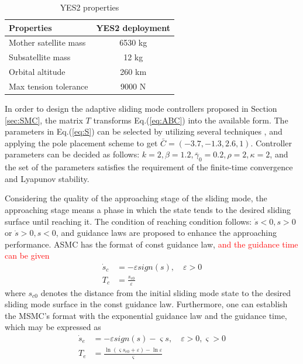 \documentclass[3p]{elsarticle}
\theoremstyle{plain}
\begin{document}
\begin{table}[h]
\begin{center}
\caption{YES2 properties}\label{ta:properites}
\begin{tabular}{lc}
\toprule
Properties              &YES2 deployment\\
\midrule
Mother satellite mass   &6530 kg\\
Subsatellite mass       &12 kg\\
Orbital altitude        &260 km\\
Max tension tolerance   &9000 N\\
\bottomrule
\end{tabular}
\end{center}
\end{table}
In order to design the adaptive sliding mode controllers proposed in Section {\ref{sec:SMC}}, the matrix $T$ transforms Eq.(\ref{eq:ABC}) into the available form. The parameters in Eq.(\ref{eq:S}) can be selected by utilizing several techniques \cite{Aggoune1994Design,Lin1993A}, and applying the pole placement scheme to get $\bar{C} = (-3.7,-1.3 ,2.6,1)$. Controller parameters can be decided as follows: $k = 2,\beta = 1.2,\bar{\gamma}_0=0.2,\rho = 2,\kappa=2$, and the set of the parameters satisfies the requirement of the finite-time convergence and Lyapunov stability.\par
Considering the quality of the approaching stage of the sliding mode, the approaching stage means a phase in which the state tends to the desired sliding surface until reaching it. The condition of reaching condition follows: $\dot{s}<0,s>0$ or $\dot{s}>0,s<0$, and guidance laws are proposed to enhance the approaching performance. ASMC has the format of const guidance law, \textcolor{red}{and the guidance time can be given}
\begin{align}
\dot{s}_c &= -\varepsilon sign(s),\quad \varepsilon>0\label{eq:sc}\\
T_c &= \frac{s_{c0}}{\varepsilon}
\end{align}
where $s_{c0}$ denotes the distance from the initial sliding mode state to the desired sliding mode surface in the const guidance law. Furthermore, one can establish the MSMC's format with the exponential guidance law and the guidance time, which may be expressed as
\begin{align}
\dot{s}_e &= -\varepsilon sign(s)-\varsigma s,\quad \varepsilon>0,\varsigma>0\\
T_e &= \frac{\ln (\varsigma s_{e0}+\varepsilon)-\ln\varepsilon}{\varsigma}
\end{align}
\end{document}
